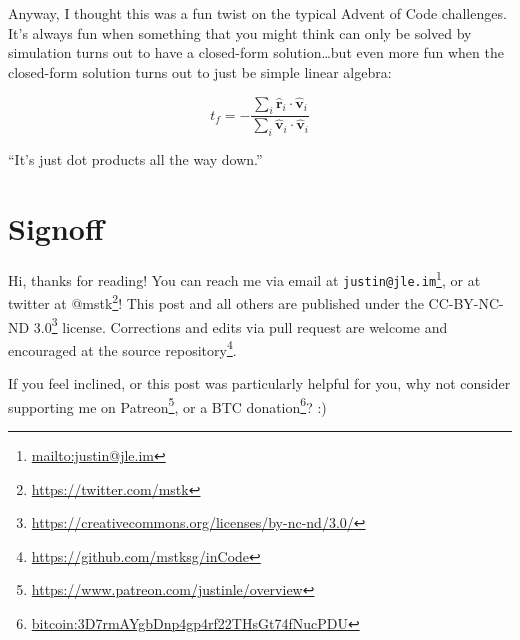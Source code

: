 \documentclass[]{article}
\renewcommand{\href}[2]{#2\footnote{\url{#1}}}
\begin{document}
Anyway, I thought this was a fun twist on the typical Advent of Code challenges.
It's always fun when something that you might think can only be solved by
simulation turns out to have a closed-form solution\ldots but even more fun when
the closed-form solution turns out to just be simple linear algebra:

\[
t_f = - \frac{\sum_i \hat{\mathbf{r}}_i \cdot \hat{\mathbf{v}}_i}{\sum_i \hat{\mathbf{v}}_i \cdot \hat{\mathbf{v}}_i}
\]

``It's just dot products all the way down.''

\section{Signoff}\label{signoff}

Hi, thanks for reading! You can reach me via email at
\href{mailto:justin@jle.im}{\nolinkurl{justin@jle.im}}, or at twitter at
\href{https://twitter.com/mstk}{@mstk}! This post and all others are published
under the \href{https://creativecommons.org/licenses/by-nc-nd/3.0/}{CC-BY-NC-ND
3.0} license. Corrections and edits via pull request are welcome and encouraged
at \href{https://github.com/mstksg/inCode}{the source repository}.

If you feel inclined, or this post was particularly helpful for you, why not
consider \href{https://www.patreon.com/justinle/overview}{supporting me on
Patreon}, or a \href{bitcoin:3D7rmAYgbDnp4gp4rf22THsGt74fNucPDU}{BTC donation}?
:)
\end{document}

